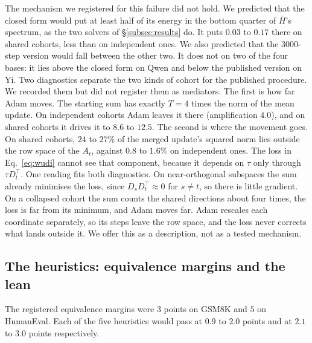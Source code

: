 The mechanism we registered for this failure did not hold. We predicted that
the closed form would put at least half of its energy in the bottom quarter of
$\bar H$'s spectrum, as the two solvers of \S\ref{subsec:results} do. It puts
$0.03$ to $0.17$ there on shared cohorts, less than on independent ones. We
also predicted that the 3000-step version would fall between the other two. It does
not on two of the four bases: it lies above the closed form on Qwen and below
the published version on Yi. Two diagnostics separate the two kinds of cohort
for the published procedure. We recorded them but did not register them as mediators.
The first is how far Adam moves. The starting sum has exactly $T = 4$ times
the norm of the mean update. On independent cohorts Adam leaves it there
(amplification $4.0$), and on shared cohorts it drives it to $8.6$ to $12.5$.
The second is where the movement goes. On shared cohorts, $24$ to $27\%$ of
the merged update's squared norm lies outside the row space of the $A_t$,
against $0.8$ to $1.6\%$ on independent ones. The loss in
Eq.~\eqref{eq:wudi} cannot see that component, because it depends on $\tau$
only through $\tau D_t^\top$. One reading fits both diagnostics. On
near-orthogonal subspaces the sum already minimises the loss, since
$D_sD_t^\top \approx 0$ for $s \neq t$, so there is little gradient. On a
collapsed cohort the sum counts the shared directions about four times, the
loss is far from its minimum, and Adam moves far. Adam rescales each
coordinate separately, so its steps leave the row space, and the loss never
corrects what lands outside it. We offer this as a description, not as a
tested mechanism.

\subsection{The heuristics: equivalence margins and the lean}\label{app:lean}

The registered equivalence margins were $3$ points on GSM8K and $5$ on
HumanEval. Each of the five heuristics would pass at $0.9$ to $2.0$ points
and at $2.1$ to $3.0$ points respectively.

